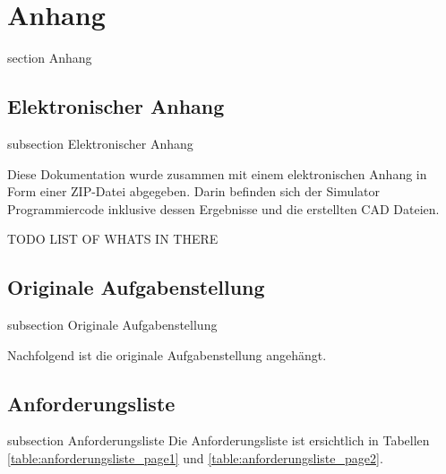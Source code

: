\newpage

\section*{Anhang}
    {section}
    {Anhang}



\subsection*{Elektronischer Anhang}\label{elect-anhang}
{subsection}
{Elektronischer Anhang}

Diese Dokumentation wurde zusammen mit einem elektronischen Anhang in Form einer ZIP-Datei abgegeben. Darin befinden sich der Simulator Programmiercode inklusive dessen Ergebnisse und die erstellten CAD Dateien.

TODO LIST OF WHATS IN THERE

\newpage

\newpage


\subsection*{Originale Aufgabenstellung}\label{aufgabenstellung}
{subsection}
{Originale Aufgabenstellung}

Nachfolgend ist die originale Aufgabenstellung angehängt.




\subsection*{Anforderungsliste}\label{anforderungliste}
    {subsection}
    {Anforderungsliste}
Die  Anforderungsliste ist ersichtlich in Tabellen \ref{table:anforderungsliste_page1} und \ref{table:anforderungsliste_page2}.

